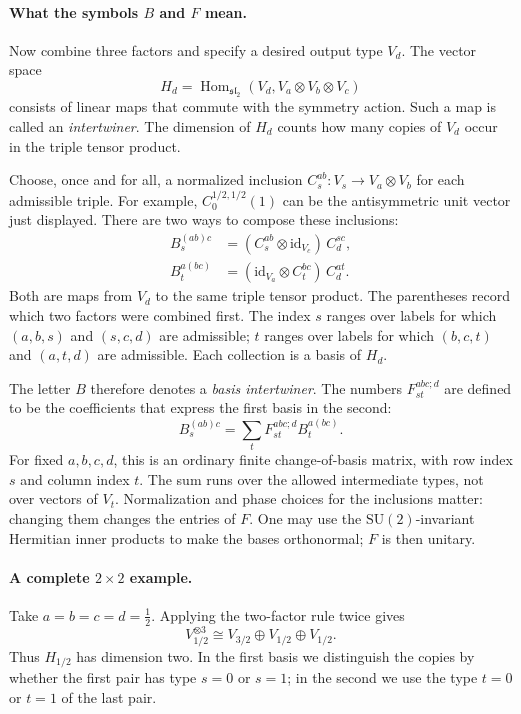 \paragraph{What the symbols $B$ and $F$ mean.}
Now combine three factors and specify a desired output type $V_d$.
The vector space
\[
 H_d=\operatorname{Hom}_{\mathfrak{sl}_2}
       (V_d,V_a\otimes V_b\otimes V_c)
\]
consists of linear maps that commute with the symmetry action.
Such a map is called an \emph{intertwiner}. The dimension of $H_d$
counts how many copies of $V_d$ occur in the triple tensor product.

Choose, once and for all, a normalized inclusion
$C_s^{ab}:V_s\longrightarrow V_a\otimes V_b$ for each admissible
triple. For example, $C_0^{1/2,1/2}(1)$ can be the antisymmetric
unit vector just displayed. There are two ways to compose these
inclusions:
\[
 \begin{aligned}
 B_s^{(ab)c}&=(C_s^{ab}\otimes\mathrm{id}_{V_c})\,C_d^{sc},\\
 B_t^{a(bc)}&=(\mathrm{id}_{V_a}\otimes C_t^{bc})\,C_d^{at}.
 \end{aligned}
\]
Both are maps from $V_d$ to the same triple tensor product.
The parentheses record which two factors were combined first.
The index $s$ ranges over labels for which $(a,b,s)$ and $(s,c,d)$
are admissible; $t$ ranges over labels for which $(b,c,t)$ and
$(a,t,d)$ are admissible. Each collection is a basis of $H_d$.

The letter $B$ therefore denotes a \emph{basis intertwiner}.
The numbers $F_{st}^{abc;d}$ are defined to be the coefficients
that express the first basis in the second:
\begin{equation}
 B_s^{(ab)c}=\sum_t F_{st}^{abc;d}B_t^{a(bc)}.
 \label{eq:introrecoupling}
\end{equation}
For fixed $a,b,c,d$, this is an ordinary finite change-of-basis
matrix, with row index $s$ and column index $t$. The sum runs
over the allowed intermediate types, not over vectors of $V_t$.
Normalization and phase choices for the inclusions matter:
changing them changes the entries of $F$. One may use the
$\mathrm{SU}(2)$-invariant Hermitian inner products to make the
bases orthonormal; $F$ is then unitary.

\paragraph{A complete $2\times2$ example.}
Take $a=b=c=d=\tfrac12$. Applying the two-factor rule twice gives
\[
 V_{1/2}^{\otimes3}\cong V_{3/2}\oplus V_{1/2}\oplus V_{1/2}.
\]
Thus $H_{1/2}$ has dimension two. In the first basis we distinguish
the copies by whether the first pair has type $s=0$ or $s=1$;
in the second we use the type $t=0$ or $t=1$ of the last pair.

